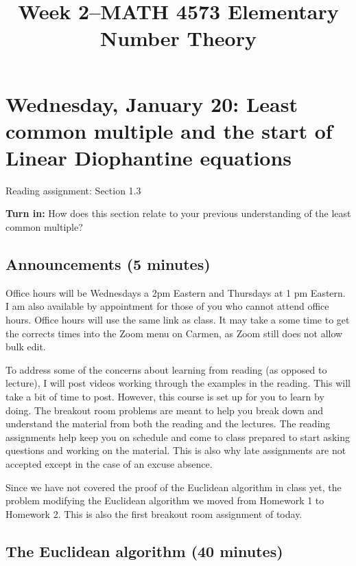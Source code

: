 \documentclass[letterpaper, 11 pt]{article}
\title{Week 2--MATH 4573 Elementary Number Theory}
\begin{document}
\maketitle
\tableofcontents
\section{Wednesday, January 20: Least common multiple and the start of Linear Diophantine equations}

Reading assignment: Section 1.3 

{\bf Turn in:} How does this section relate to your previous understanding of the least common multiple?

\subsection{Announcements (5 minutes)}
Office hours will be Wednesdays a 2pm Eastern and Thursdays at 1 pm Eastern. I am also available by appointment for those of you who cannot attend office hours. Office hours will use the same link as class. It may take a some time to get the corrects times into the Zoom menu on Carmen, as Zoom still does not allow bulk edit.

To address some of the concerns about learning from reading (as opposed to lecture), I will post videos working through the examples in the reading. This will take a bit of time to post.  However, this course is set up for you to learn by doing. The breakout room problems are meant to help you break down and understand the material from both the reading and the lectures. The reading assignments help keep you on schedule and come to class prepared to start asking questions and working on the material. This is also why late assignments are not accepted except in the case of an excuse absence.


Since we have not covered the proof of the Euclidean algorithm in class yet, the problem modifying the Euclidean algorithm we moved from Homework 1 to Homework 2. This is also the first breakout room assignment of today.

\subsection{The Euclidean algorithm (40 minutes)}
\end{document}
